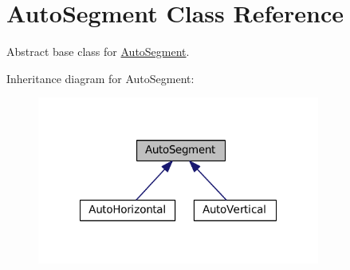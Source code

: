 \hypertarget{classKatabatic_1_1AutoSegment}{}\section{Auto\+Segment Class Reference}
\label{classKatabatic_1_1AutoSegment}


Abstract base class for \mbox{\hyperlink{classKatabatic_1_1AutoSegment}{Auto\+Segment}}.  




Inheritance diagram for Auto\+Segment\+:\nopagebreak
\begin{figure}[H]
\begin{center}
\leavevmode
\includegraphics[width=263pt]{classKatabatic_1_1AutoSegment__inherit__graph}
\end{center}
\end{figure}
